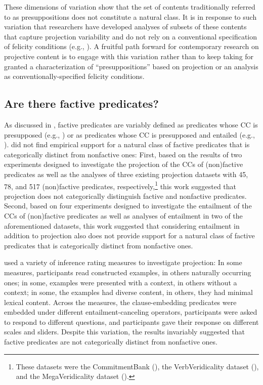 \documentclass[11pt,fleqn]{article}
\newcommand{\6}{\mbox{$[\hspace*{-.6mm}[$}}
\newcommand{\9}{\mbox{$]\hspace*{-.6mm}]$}}
\begin{document}
These dimensions of variation show that the set of contents traditionally referred to as presuppositions does not constitute a natural class. It is in response to such variation that researchers have developed analyses of subsets of these contents that capture projection variability and do not rely on a conventional specification of felicity conditions (e.g., \citealt{abrusan2011,abrusan2013,abrusan2016,abusch02,abusch10,romoli2015}). A fruitful path forward for contemporary research on projective content is to engage with this variation rather than to keep taking for granted a characterization of ``presuppositions''  based on projection or an analysis as conventionally-specified felicity conditions.

\subsection{Are there factive predicates?}

As discussed in \citealt{degen-tonhauser-language}, factive predicates are variably defined as predicates whose CC is presupposed (e.g., \citealt{kiparsky-kiparsky70}) or as predicates whose CC is presupposed and entailed (e.g., \citealt{gazdar79a,schlenker10,abrusan2011}). \citealt{degen-tonhauser-language} did not find empirical support for a natural class of factive predicates that is categorically distinct from nonfactive ones: First, based on the results of two experiments designed to investigate the projection of the CCs of (non)factive predicates as well as the analyses of three existing projection datasets with 45, 78, and 517 (non)factive predicates, respectively,\footnote{These datasets were the CommitmentBank (\citealt{demarneffe-etal-sub23}), the VerbVeridicality dataset (\citealt{ross-pavlick2019}), and the MegaVeridicality dataset (\citealt{white-rawlins-nels2018}).} this work suggested that projection does not categorically distinguish factive and nonfactive predicates. Second, based on four experiments designed to investigate the entailment of the CCs of (non)factive predicates as well as analyses of entailment in two of the aforementioned datasets, this work suggested that considering entailment in addition to projection also does not provide support for a natural class of factive predicates that is categorically distinct from nonfactive ones. 

\citealt{degen-tonhauser-language} used a variety of inference rating measures to investigate projection: In some measures, participants read constructed examples, in others naturally occurring ones; in some, examples were presented with a context, in others without a context; in some, the examples had diverse content, in others, they had minimal lexical content. Across the measures, the clause-embedding predicates were embedded under different entailment-canceling operators, participants were asked to respond to different questions, and participants gave their response on different scales and sliders. Despite this variation, the results invariably suggested that factive predicates are not categorically distinct from nonfactive ones. 
\end{document}
